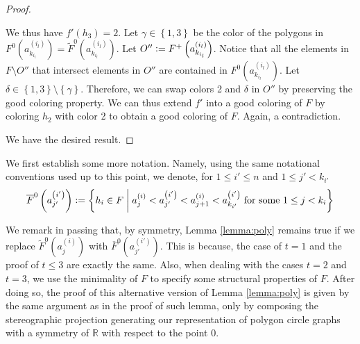 \documentclass[12pt]{article}
\theoremstyle{definition}
\newcommand{\defeq}{\vcentcolon=}
\begin{document}
\begin{proof}
\begin{itemize}
             We thus have $f'\left(h_3\right) = 2$.
             Let $\gamma \in \left\{1, 3\right\}$
             be the color of the polygons
             in $F^{0}\left(a_{k_{i_{l}}}^{\left(i_{l}\right)}\right)
             = \widetilde{F}^{0}\left(
             a_{k_{i_{l}}}^{\left(i_{l}\right)}\right)$.
             Let $O'' \defeq F^{+}\left(
             a_{k_{i_{l}}}^{\left(i_{l}\right)}\right)$.
             Notice that all the elements
             in $F \setminus O''$ 
             that intersect elements in $O''$
             are contained in $F^{0}\left(
             a_{k_{i_{l}}}^{\left(i_{l}\right)}\right)$.
             Let $\delta \in \left\{1, 3\right\}
             \setminus \left\{\gamma\right\}$.
             Therefore, we can swap colors
             2 and $\delta$ in $O''$
             by preserving the good coloring property.
             We can thus extend $f'$ into a
             good coloring of $F$ by
             coloring $h_2$ with color 2
             to obtain a good coloring of $F$.
             Again, a contradiction.
         \end{itemize} 
     We have the desired result. 
     \end{proof}

     We first establish some more notation.
     Namely, using the same notational conventions
     used up to this point, we denote, for
     $1 \leq i' \leq n$ and $1 \leq j' < k_{i'}$
     \begin{gather*}
         \overline{F}^{0}\left(a_{j'}^{\left(i'\right)}\right) \defeq
         \left\{h_{i} \in F \;\middle|\;
         a_{j}^{\left(i\right)} <
         a_{j'}^{\left(i'\right)} <
         a_{j+1}^{\left(i\right)} <
         a_{k_{i'}}^{\left(i'\right)}
         \text{ for some }
         1 \leq j < k_{i}\right\}
     \end{gather*}
     
     We remark in passing that, by symmetry,
     Lemma \ref{lemma:poly} remains 
     true if we
     replace $\widetilde{F}^{0}\left(a_{j}^{\left(i\right)}\right)$ 
     with $\overline{F}^{0}\left(a_{j'}^{\left(i'\right)}\right)$.
     This is because, the case of $t = 1$
     and the proof of $t \leq 3$ are exactly
     the same. Also, when 
     dealing with the cases $t = 2$ 
     and $t = 3$, we use the minimality
     of $F$ to specify some structural
     properties of $F$. After doing so,
     the proof of this alternative version of
     Lemma \ref{lemma:poly} is given by 
     the same argument as in the proof
     of such lemma, only by composing
     the stereographic projection
     generating our representation
     of polygon circle graphs with
     a symmetry of $\mathbb{R}$ with
     respect to the point 0.
\end{document}
